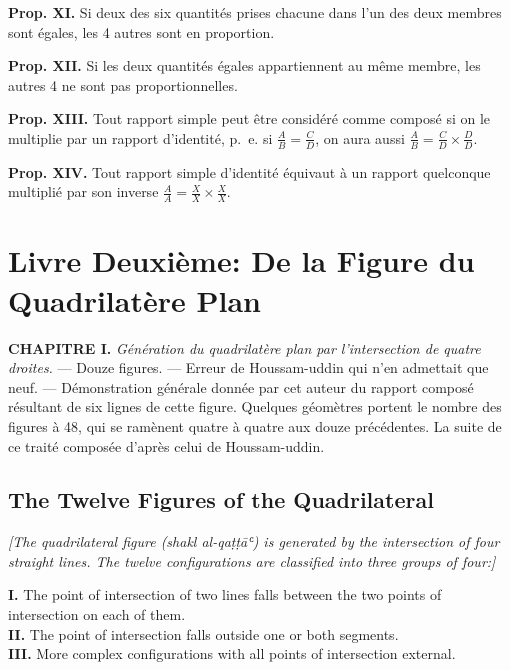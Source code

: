 \documentclass[11pt,a4paper]{article}
\theoremstyle{plain}
\theoremstyle{definition}
\theoremstyle{remark}
\begin{document}
\textbf{Prop. XI.} Si deux des six quantités prises chacune dans l'un des deux membres sont égales, les 4 autres sont en proportion.

\textbf{Prop. XII.} Si les deux quantités égales appartiennent au même membre, les autres 4 ne sont pas proportionnelles.

\textbf{Prop. XIII.} Tout rapport simple peut être considéré comme composé si on le multiplie par un rapport d'identité, p.~e. si $\frac{A}{B} = \frac{C}{D}$, on aura aussi $\frac{A}{B} = \frac{C}{D} \times \frac{D}{D}$.

\textbf{Prop. XIV.} Tout rapport simple d'identité équivaut à un rapport quelconque multiplié par son inverse $\frac{A}{A} = \frac{X}{X} \times \frac{X}{X}$.


\clearpage

\section{Livre Deuxième: De la Figure du Quadrilatère Plan}
\label{sec:livre2}


\textbf{CHAPITRE I.} \textit{Génération du quadrilatère plan par l'intersection de quatre droites.} --- Douze figures. --- Erreur de Houssam-uddin qui n'en admettait que neuf. --- Démonstration générale donnée par cet auteur du rapport composé résultant de six lignes de cette figure. Quelques géomètres portent le nombre des figures à 48, qui se ramènent quatre à quatre aux douze précédentes. La suite de ce traité composée d'après celui de Houssam-uddin.


\subsection{The Twelve Figures of the Quadrilateral}
\label{sec:12figs}

\noindent\textit{[The quadrilateral figure (shakl al-qaṭṭāʿ) is generated by the intersection of four straight lines. The twelve configurations are classified into three groups of four:]}\\

\begin{center}
\textbf{I.} The point of intersection of two lines falls between the two points of intersection on each of them.\\[0.3cm]
\textbf{II.} The point of intersection falls outside one or both segments.\\[0.3cm]
\textbf{III.} More complex configurations with all points of intersection external.\\[0.3cm]
\end{center}
\end{document}
